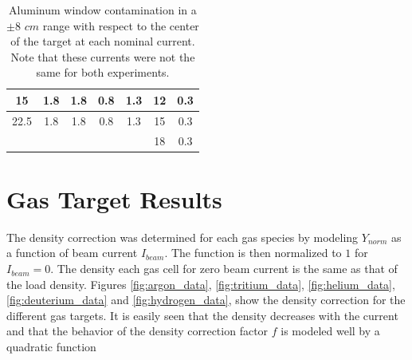 \documentclass[final,5p,times,twocolumn]{elsarticle}
\begin{document}
\begin{table}[h!]
\begin{tabular}{|c|c|c|c|c|c|c|}
15                                                               & 1.8                                                             & 1.8                                                              & 0.8                                                             & 1.3                                                             & 12                                                              & 0.3                                                                                \\ \hline
22.5                                                             & 1.8                                                             & 1.8                                                              & 0.8                                                             & 1.3                                                             & 15                                                              & 0.3                                                                                \\ \hline
\multicolumn{5}{|l|}{}                                                                                                                                                                                                                                                                                                                    & 18                                                              & 0.3                                                                                \\ \hline
\end{tabular}
\caption{Aluminum window contamination in a $\pm 8$ $cm$ range with respect to the center of the target at each nominal current. Note that these currents were not the same for both experiments.}
\label{tab:contamination_al}
\end{table}

 
\section{Gas Target Results}

The density correction was determined for each gas species by modeling $Y_{norm}$ as a function of beam current $I_{beam}$. The function is then normalized to $1$ for $I_{beam}=0$. The density each gas cell for zero beam current is the same as that of the load density. Figures  \ref{fig:argon_data}, \ref{fig:tritium_data}, \ref{fig:helium_data}, \ref{fig:deuterium_data} and \ref{fig:hydrogen_data}, show the density correction for the different gas targets. It is easily seen that the density decreases with the current and that the behavior of the density correction factor $f$ is modeled well by a quadratic function
\end{document}
